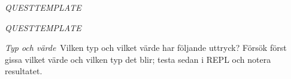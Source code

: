 \clearpage

\AdvancedTasks






\def\what{\emph{QUESTTEMPLATE}}

\QUESTBEGIN

\Task \what

\Subtask

\SOLUTION

\TaskSolved \what

\SubtaskSolved 

\QUESTEND




\clearpage

\AdvancedTasks







\clearpage

\ExtraTasks



\def\what{\emph{Typ och värde}}

\QUESTBEGIN

\Task \what~Vilken typ och vilket värde har följande uttryck?  Försök först gissa vilket värde och vilken typ det blir; testa sedan i REPL och notera resultatet.

\Subtask {}

\Subtask {}

\Subtask {}

\Subtask {}

\Subtask {}

\Subtask {}

\Subtask {}

\Subtask {}

\Subtask {}

\Subtask \linebreak[0] 

\Subtask {}

\Subtask {}

\Subtask {}

\Subtask {}

